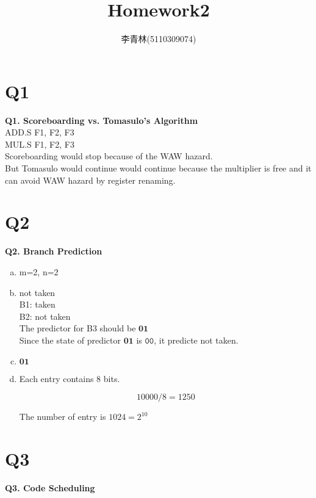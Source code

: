 \documentclass[12pt]{article}
\begin{document}
\begin{CJK*}{UTF8}{gbsn}
\title{Homework2}
\author{李青林(5110309074)}
\date{}
\maketitle

\section{Q1}
\textbf{Q1. Scoreboarding vs. Tomasulo’s Algorithm}\\

ADD.S F1, F2, F3\\
MUL.S F1, F2, F3\\

Scoreboarding would stop because of the WAW hazard.\\
But Tomasulo would continue would continue because the multiplier is free and it can avoid WAW hazard by register renaming.

\section{Q2}
\textbf{Q2. Branch Prediction}

\begin{enumerate}[a)]

\item 
m=2, n=2

\item
not taken\\

B1: taken\\
B2: not taken\\

The predictor for B3 should be $\mathbf{01}$\\
Since the state of predictor $\mathbf{01}$ is $\mathtt{00}$, it predicte not taken.

\item
$\mathbf{01}$

\item
Each entry contains $8$ bits.

$$10000/8=1250$$

The number of entry is $1024 = 2^{10}$
	
\end{enumerate}

\section{Q3}
\textbf{Q3. Code Scheduling}


\end{CJK*}
\end{document}
